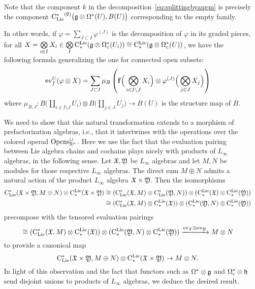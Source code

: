 \documentclass[11pt]{amsart}
\numberwithin{equation}{section}
\begin{document}
{\begin{rmk}
Note that the component $k$ in the decomposition~\eqref{eq:splittingbyaugm} is precisely the component 
${{\rm C}_{\rm Lie}^*}^{(\emptyset)}\big(\mathfrak g\otimes \Omega^*(U), B(U)\big)$ corresponding to the empty family.
\end{rmk}
In other words, if $\varphi = \sum_{J\subset I} \varphi^{(J)}$ is the decomposition of $\varphi$ in its graded pieces, for all 
$X= \bigotimes\limits_{i\in I} X_i \in \bigotimes\limits_{I}{\rm C}^{\rm Lie}_*(\mathfrak g\otimes \Omega_c^*(U_i)) \cong {\rm C}^{\rm Lie}_*(\mathfrak g\otimes \Omega^*_c(U))$, we 
have the following formula generalizing the one for connected open  subsets:
\begin{equation} {\rm ev}_f^U(\varphi\otimes X)= \sum_{J\subset I} \mu_B\left(\mathbf{f}\Big(\bigotimes\limits_{i\in I\setminus J} 
X_i\Big)\otimes  \varphi^{(J)}\Big(\bigotimes\limits_{j\in J} 
X_j\Big)\right) \end{equation}
where $\mu_{B,J}: B\Big(\coprod\limits_{i\in I\setminus J}U_i\Big)\otimes B\Big(\coprod\limits_{j\in J}U_j\Big) \to B(U)$
is the  structure map of $B$.
}

We need to show that this natural transformation extends to a morphism of prefactorization algebras,
i.e., that it intertwines with the operations over the colored operad ${\rm Opens}_{\mathbb R^n}^\sqcup$.
Here we use the fact that the evaluation pairing between Lie algebra chains and cochains plays nicely with products of $L_\infty$ algebras, in the following sense.
Let $\mathfrak X, \mathfrak Y$ be $L_\infty$ algebras and let $M, N$ be modules for those respective $L_\infty$ algebras.
The direct sum $M \oplus N$ admits a natural action of the product $L_\infty$ algebra $\mathfrak X \times \mathfrak Y$.
Then the isomorphisms
\begin{align*}
{\rm C}_{\rm Lie}^*(\mathfrak X \times \mathfrak Y, M \oplus N) \otimes {\rm C}^{\rm Lie}_*(\mathfrak X \times \mathfrak Y) 
&\cong ({\rm C}_{\rm Lie}^*(\mathfrak X, M) \otimes {\rm C}_{\rm Lie}^*(\mathfrak Y,N) ) \otimes ({\rm C}^{\rm Lie}_*(\mathfrak X) \otimes {\rm C}^{\rm Lie}_*(\mathfrak Y) ) \\
&\cong ({\rm C}_{\rm Lie}^*(\mathfrak X,M) \otimes {\rm C}^{\rm Lie}_*(\mathfrak X) ) \otimes ({\rm C}^{\rm Lie}_*(\mathfrak Y,N) \otimes {\rm C}^{\rm Lie}_*(\mathfrak Y) )
\end{align*}
precompose with the tensored evaluation pairings
\[
\cong ({\rm C}_{\rm Lie}^*(\mathfrak X,M) \otimes {\rm C}^{\rm Lie}_*(\mathfrak X) ) \otimes ({\rm C}^{\rm Lie}_*(\mathfrak Y,N) \otimes {\rm C}^{\rm Lie}_*(\mathfrak Y) ) \xrightarrow{{\rm ev}_\mathfrak X \otimes {\rm ev}_\mathfrak Y} M \otimes N
\]
to provide a canonical map
\[
{\rm C}_{\rm Lie}^*(\mathfrak X \times \mathfrak Y, M \oplus N) \otimes {\rm C}^{\rm Lie}_*(\mathfrak X \times \mathfrak Y) \to M \otimes N.
\]
In light of this observation and the fact that functors such as $\Omega^* \otimes \mathfrak g$ and $\Omega^*_c \otimes \mathfrak h$ send disjoint unions to products of $L_\infty$ algebras,
we deduce the desired result.
\end{document}
